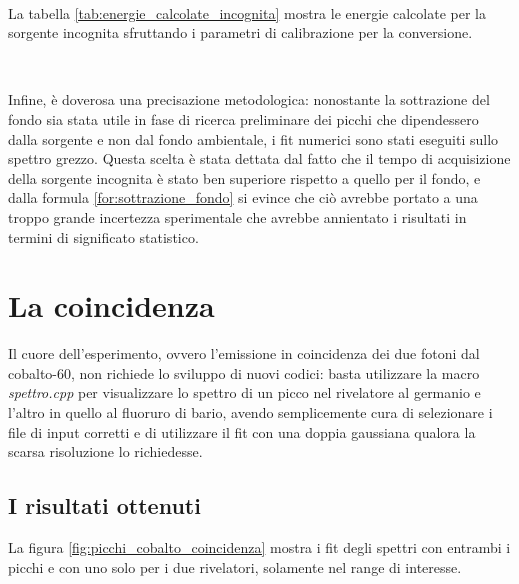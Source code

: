 \documentclass{article}
\begin{document}
            \newpage
            \begin{table}[h!]
                \centering
                \caption{risultati fit sorgente incognita}
                \label{tab:fit_picchi_incognita_germanio}
                    $
                    $
            \end{table}

            La tabella \ref{tab:energie_calcolate_incognita} mostra le energie calcolate per la sorgente incognita sfruttando i parametri di calibrazione per la conversione.
            \begin{table}[h!]
                \centering
                \caption{energie sorgente incognita}
                \label{tab:energie_calcolate_incognita}
                $
                
                $
            \end{table}

            \newpage
            Infine, è doverosa una precisazione metodologica: nonostante la sottrazione del fondo sia stata utile in fase di ricerca preliminare dei picchi che dipendessero dalla sorgente e non dal fondo ambientale, i fit numerici sono stati eseguiti sullo spettro grezzo. Questa scelta è stata dettata dal fatto che il tempo di acquisizione della sorgente incognita è stato ben superiore rispetto a quello per il fondo, e dalla formula \eqref{for:sottrazione_fondo} si evince che ciò avrebbe portato a una troppo grande incertezza sperimentale che avrebbe annientato i risultati in termini di significato statistico.

    \section{La coincidenza}
        Il cuore dell'esperimento, ovvero l'emissione in coincidenza dei due fotoni dal cobalto-60, non richiede lo sviluppo di nuovi codici: basta utilizzare la macro \textit{spettro.cpp} per visualizzare lo spettro di un picco nel rivelatore al germanio e l'altro in quello al fluoruro di bario, avendo semplicemente cura di selezionare i file di input corretti e di utilizzare il fit con una doppia gaussiana qualora la scarsa risoluzione lo richiedesse.

        \subsection*{I risultati ottenuti}
            La figura \ref{fig:picchi_cobalto_coincidenza} mostra i fit degli spettri con entrambi i picchi e con uno solo per i due rivelatori, solamente nel range di interesse.
            
\end{document}
